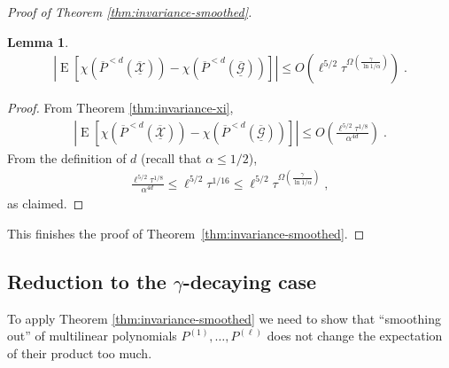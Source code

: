 \documentclass{daj}
\newcommand{\1}{\mathbbm{1}}
\theoremstyle{plain}
\newtheorem{lemma}[theorem]{Lemma}
\theoremstyle{definition}
\DeclareMathOperator*{\EE}{E}
\begin{document}
\begin{proof}[Proof of Theorem \ref{thm:invariance-smoothed}]
\begin{lemma}
\begin{align*}
\left| \EE \left[
      \chi(\overline{P}^{<d}(\underline{\overline{\mathcal{X}}})) -
      \chi(\overline{P}^{<d}(\underline{\overline{\mathcal{G}}}))
\right] \right|
\le
O\left( \ell^{5/2} \tau^{\Omega \left( \frac{\gamma}{\ln 1/\alpha} \right)} \right) \; .
\end{align*}
\end{lemma}

\begin{proof}
From Theorem \ref{thm:invariance-xi},
\begin{align*}
\left| \EE \left[
      \chi(\overline{P}^{<d}(\underline{\overline{\mathcal{X}}})) -
      \chi(\overline{P}^{<d}(\underline{\overline{\mathcal{G}}}))
\right] \right|
\le
O\left(\frac{\ell^{5/2} \tau^{1/8}}{\alpha^{4d}} \right) \; .
\end{align*}
From the definition of $d$ (recall that $\alpha \le 1/2$),
\begin{align*}
  \frac{\ell^{5/2} \tau^{1/8}}{\alpha^{4d}} \le \ell^{5/2} \tau^{1/16} \le 
  \ell^{5/2} \tau^{\Omega\left( \frac{\gamma}{\ln 1/\alpha} \right)} \; ,
\end{align*}
as claimed.
\end{proof}
This finishes the proof of Theorem~\ref{thm:invariance-smoothed}.
\renewcommand{\qedsymbol}{}
\end{proof}

\subsection{Reduction to the 
\texorpdfstring{$\gamma$}{gamma}-decaying case}

To apply Theorem \ref{thm:invariance-smoothed} we
need to show that ``smoothing out''  of multilinear polynomials 
$P^{(1)}, \ldots, P^{(\ell)}$
does not change the expectation of their product too much.
\end{document}
